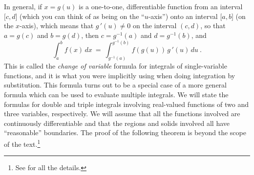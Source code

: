 In general, if $x = g(u)$ is a one-to-one, differentiable function from an interval $\lbrack c,d \rbrack$ (which you can
think of as being on the ``$u$-axis'') onto an interval $\lbrack a,b \rbrack$ (on the $x$-axis), which means that
$g\,'(u) \ne 0$ on the interval $(c,d)$, so that $a=g(c)$ and $b=g(d)$, then $c=g^{-1}(a)$ and $d=g^{-1}(b)$, and
\begin{equation}
 \int_a^b f(x)\,dx ~=~ \int_{g^{-1}(a)}^{g^{-1}(b)} f(g(u))\,g\,'(u)\,du ~.
\end{equation}
This is called the \emph{change of variable} formula for integrals of single-variable functions, and it is what you were
implicitly using when doing integration by substitution. This formula turns out to be a special case of a more general
formula which can be used to evaluate multiple integrals. We will state the formulas for double and triple integrals
involving real-valued functions of two and three variables, respectively.
We will assume that all the functions involved are continuously differentiable and that the regions and solids involved
all have ``reasonable'' boundaries. The proof of the following theorem is beyond the scope of the
text.\footnote{See \cite[\S\,15.32 and \S\,15.62]{tm} for all the details.}

